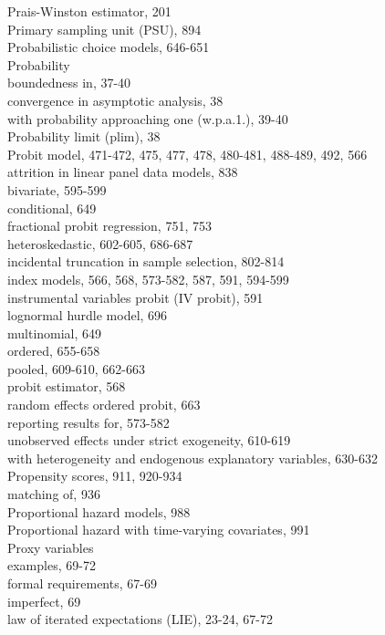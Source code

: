 \documentclass[10pt]{article}
\begin{document}
Prais-Winston estimator, 201\\
Primary sampling unit (PSU), 894\\
Probabilistic choice models, 646-651\\
Probability\\
boundedness in, 37-40\\
convergence in asymptotic analysis, 38\\
with probability approaching one (w.p.a.1.), 39-40\\
Probability limit (plim), 38\\
Probit model, 471-472, 475, 477, 478, 480-481, 488-489, 492, 566\\
attrition in linear panel data models, 838\\
bivariate, 595-599\\
conditional, 649\\
fractional probit regression, 751, 753\\
heteroskedastic, 602-605, 686-687\\
incidental truncation in sample selection, 802-814\\
index models, 566, 568, 573-582, 587, 591, 594-599\\
instrumental variables probit (IV probit), 591\\
lognormal hurdle model, 696\\
multinomial, 649\\
ordered, 655-658\\
pooled, 609-610, 662-663\\
probit estimator, 568\\
random effects ordered probit, 663\\
reporting results for, 573-582\\
unobserved effects under strict exogeneity, 610-619\\
with heterogeneity and endogenous explanatory variables, 630-632\\
Propensity scores, 911, 920-934\\
matching of, 936\\
Proportional hazard models, 988\\
Proportional hazard with time-varying covariates, 991\\
Proxy variables\\
examples, 69-72\\
formal requirements, 67-69\\
imperfect, 69\\
law of iterated expectations (LIE), 23-24, 67-72\\
\end{document}
